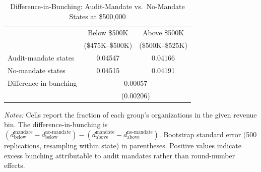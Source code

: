 \begin{table}[t]
\centering
\caption{Difference-in-Bunching: Audit-Mandate vs.\ No-Mandate States at \$500,000}
\label{tab:dib}
\begin{tabular}{lcc}
\hline\hline
 & Below \$500K & Above \$500K \\
 & (\$475K--\$500K) & (\$500K--\$525K) \\
\hline
Audit-mandate states & 0.04547 & 0.04166 \\
No-mandate states & 0.04515 & 0.04191 \\
\hline
Difference-in-bunching & \multicolumn{2}{c}{0.00057} \\
 & \multicolumn{2}{c}{(0.00206)} \\
\hline\hline
\end{tabular}
\begin{tablenotes}[flushleft]
\small
\item \textit{Notes:} Cells report the fraction of each group's organizations in the given revenue bin. The difference-in-bunching is $(d^{\text{mandate}}_{\text{below}} - d^{\text{no-mandate}}_{\text{below}}) - (d^{\text{mandate}}_{\text{above}} - d^{\text{no-mandate}}_{\text{above}})$. Bootstrap standard error (500 replications, resampling within state) in parentheses. Positive values indicate excess bunching attributable to audit mandates rather than round-number effects.
\end{tablenotes}
\end{table}
